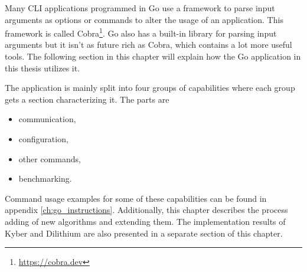 Many CLI applications programmed in Go use a framework to parse input arguments as options or commands to alter the usage of an application. This framework is called Cobra\footnote{\url{https://cobra.dev}}. Go also has a built-in library for parsing input arguments but it isn't as future rich as Cobra, which contains a lot more useful tools. The following section in this chapter will explain how the Go application in this thesis utilizes it.

The application is mainly split into four groups of capabilities where each group gets a section characterizing it. The parts are
\begin{itemize}
  \item communication,
  \item configuration,
  \item other commands,
  \item benchmarking.
\end{itemize}
\noindent Command usage examples for some of these capabilities can be found in appendix \ref{ch:go_instructions}. Additionally, this chapter describes the process adding of new algorithms and extending them. The implementation results of Kyber and Dilithium are also presented in a separate section of this chapter.
